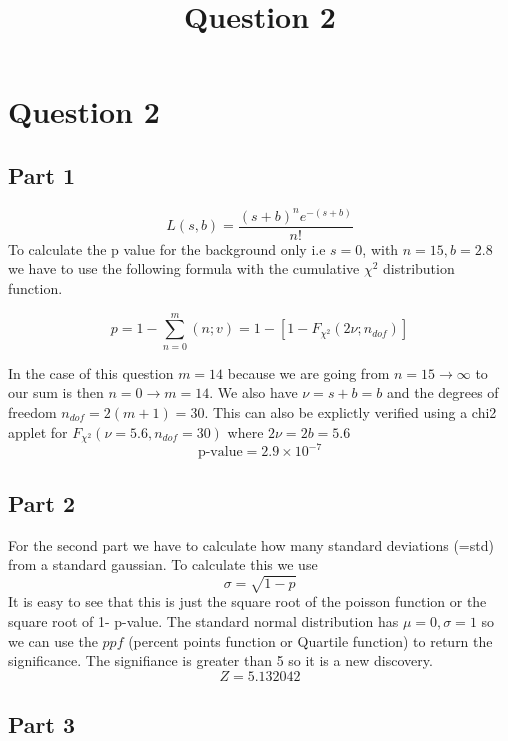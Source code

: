 \documentclass[11pt]{article}
\title{Question 2}
\begin{document}
    
    \maketitle
    
    

    
    \hypertarget{question-2}{%
\section{Question 2}\label{question-2}}

    \hypertarget{part-1}{%
\subsection{Part 1}\label{part-1}}

    \[ L(s,b) = \frac{(s+b)^n e^{-(s+b)}}{n!} \] To calculate the p value
for the background only i.e \(s=0\), with \(n=15, b=2.8\) we have to use
the following formula with the cumulative \(\chi^2\) distribution
function.

\[ p = 1 - \sum_{n=0}^{m} (n;v) = 1 - [ 1- F_{\chi^2} (2 \nu; n_{dof})] \]

In the case of this question \(m=14\) because we are going from
\(n=15 \rightarrow \infty\) to our sum is then \(n=0 \rightarrow m=14\).
We also have \(\nu = s+b = b\) and the degrees of freedom
\(n_{dof} = 2(m+1) = 30\). This can also be explictly verified using a
chi2 applet for \(F_{\chi^2} (\nu = 5.6, n_{dof} = 30)\) where $ 2
\nu = 2 b = 5.6$ \[ \text{p-value}= 2.9 \times 10^{-7} \]

    \hypertarget{part-2}{%
\subsection{Part 2}\label{part-2}}

    For the second part we have to calculate how many standard deviations
(=std) from a standard gaussian. To calculate this we use
\[ \sigma = \sqrt{1-p} \] It is easy to see that this is just the square
root of the poisson function or the square root of 1- p-value. The
standard normal distribution has \(\mu =0, \sigma =1\) so we can use the
\(ppf\) (percent points function or Quartile function) to return the
significance. The signifiance is greater than 5 so it is a new
discovery. \[ Z= 5.132042  \]

    \hypertarget{part-3}{%
\subsection{Part 3}\label{part-3}}
\end{document}
